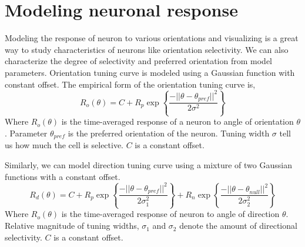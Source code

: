 \documentclass[MTech]{iitmdiss}
\begin{document}
\section{Modeling neuronal response} %
\label{sec:modeling_neuronal_response_to_sinusoidal_gratings_stimuli}
Modeling the response of neuron to various orientations and visualizing is a great way to study characteristics of neurons like orientation selectivity. We can also characterize the degree of selectivity and preferred orientation from model parameters.
Orientation tuning curve is modeled using a Gaussian function with constant offset. The empirical form of the orientation tuning curve is,
$$R_o(\theta) = C + R_p \exp\left\{\frac{-||\theta-\theta_{pref}||^2}{2\sigma^2}\right\}$$
Where $R_o(\theta)$ is the time-averaged response of a neuron to angle of orientation $\theta$. Parameter $\theta_{pref}$ is the preferred orientation of the neuron. Tuning width $\sigma$  tell us how much the cell is selective. $C$ is a constant offset.

Similarly, we can model direction tuning curve using a mixture of two Gaussian functions with a constant offset. 
$$R_d(\theta) = C + R_p \exp\left\{\frac{-||\theta-\theta_{pref}||^2}{2\sigma_1^2}\right\} + R_n \exp\left\{\frac{-||\theta-\theta_{null}||^2}{2\sigma_2^2}\right\}$$
Where $R_o(\theta)$ is the time-averaged response of neuron to angle of direction $\theta$. Relative magnitude of tuning widths, $\sigma_1$ and $\sigma_2$ denote the amount of directional selectivity. $C$ is a constant offset.
\end{document}
